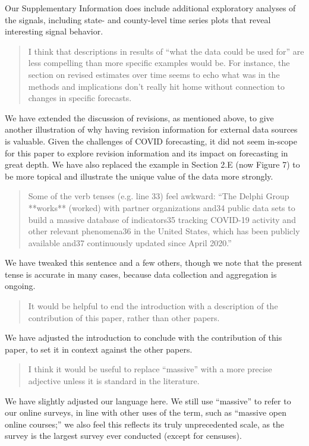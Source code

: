 \documentclass[11pt]{article}
\begin{document}
Our Supplementary Information does include additional exploratory analyses of
the signals, including state- and county-level time series plots that reveal
interesting signal behavior.

\begin{quote}
  I think that descriptions in results of ``what the data could be used for''
  are less compelling than more specific examples would be. For instance, the
  section on revised estimates over time seems to echo what was in the methods
  and implications don't really hit home without connection to changes in
  specific forecasts.
\end{quote}
We have extended the discussion of revisions, as mentioned above, to give
another illustration of why having revision information for external data
sources is valuable. Given the challenges of COVID forecasting, it did not seem
in-scope for this paper to explore revision information and its impact on
forecasting in great depth. We have also replaced the example in Section 2.E
(now Figure 7) to be more topical and illustrate the unique value of the data
more strongly.

\begin{quote}
  Some of the verb tenses (e.g. line 33) feel awkward: ``The Delphi Group
  **works** (worked) with partner organizations and34 public data sets to build
  a massive database of indicators35 tracking COVID-19 activity and other
  relevant phenomena36 in the United States, which has been publicly available
  and37 continuously updated since April 2020.''
\end{quote}
We have tweaked this sentence and a few others, though we note that the present
tense is accurate in many cases, because data collection and aggregation is
ongoing.

\begin{quote}
  It would be helpful to end the introduction with a description of the
  contribution of this paper, rather than other papers.
\end{quote}
We have adjusted the introduction to conclude with the contribution of this
paper, to set it in context against the other papers.

\begin{quote}
  I think it would be useful to replace ``massive'' with a more precise
  adjective unless it is standard in the literature.
\end{quote}
We have slightly adjusted our language here. We still use ``massive'' to refer
to our online surveys, in line with other uses of the term, such as ``massive
open online courses;'' we also feel this reflects its truly unprecedented scale,
as the survey is the largest survey ever conducted (except for censuses).
\end{document}
